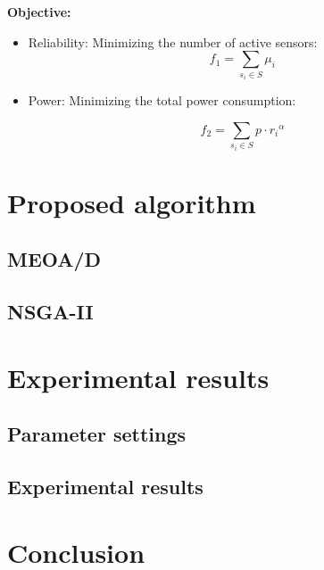 \documentclass[preprint,12pt]{elsarticle}
\begin{document}
\textbf{Objective:}
\begin{itemize}
    \item Reliability: Minimizing the number of active sensors:
    \begin{equation}
        f_1 = \sum_{s_i \in S} \mu_i
    \end{equation}
    \item Power: Minimizing the total power consumption:
    
    \begin{equation}
        f_2 = \sum_{s_i \in S} p \cdot {r_i}^\alpha
    \end{equation}
\end{itemize}


\section{Proposed algorithm}\label{algorithms_sec}
\subsection{MEOA/D}
\subsection{NSGA-II}

\section{Experimental results}
\subsection{Parameter settings}



\subsection{Experimental results}
\section{Conclusion}\label{conclusion_sec}

\appendix



\end{document}
